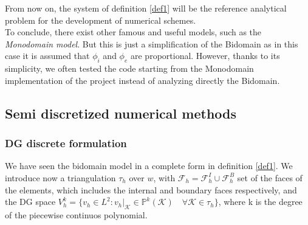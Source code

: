 \documentclass[a4paper,12pt]{article}
\begin{document}
    \vspace{4mm}
    \noindent From now on, the system of definition \ref{def1} will be the reference analytical problem for the development of numerical schemes.\\
    To conclude, there exist other famous and useful models, such as the \emph{Monodomain model}. But this is just a simplification of the Bidomain as in this case it is assumed that $\phi_i$ and $\phi_e$ are proportional. However, thanks to its simplicity, we often tested the code starting from the Monodomain implementation of the project \cite{andreotti} instead of analyzing directly the Bidomain.

    \subsection{Semi discretized numerical methods}
    \subsubsection{DG discrete formulation}
    We have seen the bidomain model in a complete form in definition \ref{def1}. We introduce now a triangulation $\tau_h$ over $w$, with $\mathcal{F} _h=\mathcal{F} _h^I \cup \mathcal{F} _h^B$ set of the faces of the elements, which includes the internal and boundary faces respectively, and the DG space $V_h^k = \{v_h \in L^2 : v_h|_\mathcal{K} \in \mathbb{P}^{k}(\mathcal{K})  \quad \forall \mathcal{K} \in \tau_h \}$, where k is the degree of the piecewise continuos polynomial.
    
\end{document}
